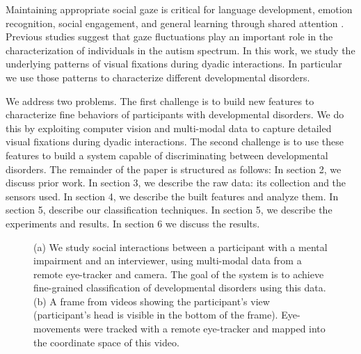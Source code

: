 \documentclass{llncs}
\begin{document}
  Maintaining appropriate social gaze is critical for language development, emotion recognition, social engagement, and general learning through shared attention \cite{Csibra:2006wf}. Previous studies \cite{klin2002,Golarai} suggest that gaze fluctuations play an important role in the characterization of individuals in the autism spectrum. In this work, we study the underlying patterns of visual fixations during dyadic interactions. In particular we use those patterns to characterize different developmental disorders.

  We address two problems. The first challenge is to build new features to characterize fine behaviors of participants with developmental disorders. We do this by exploiting computer vision and multi-modal data to capture detailed visual fixations during dyadic interactions. The second challenge is to use these features to build a system capable of discriminating between developmental disorders. The remainder of the paper is structured as follows: In section 2, we discuss prior work. In section 3, we describe the raw data: its collection and the sensors used. In section 4, we describe the built features and analyze them. In section 5, describe our classification techniques. In section 5, we describe the experiments and results. In section 6 we discuss the results.

  \begin{figure}
    \hfill


    \label{fig:pull_figure}
    \caption{(a) We study social interactions between a participant with a mental impairment and an interviewer, using multi-modal data from a remote eye-tracker and camera. The goal of the system is to achieve fine-grained classification of developmental disorders using this data. (b) A frame from videos showing the participant's view (participant's head is visible in the bottom of the frame). Eye-movements were tracked with a remote eye-tracker and mapped into the coordinate space of this video.
    }
  \end{figure}
  \vspace{-3em}
\end{document}
